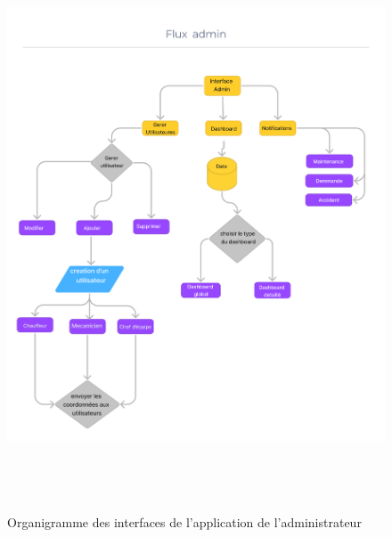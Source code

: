     
  \begin{figure}[htbp]
  \centering
  \includegraphics[width=1.05\textwidth,height=17cm]{chap2.images/org admin.png}
  \caption{Organigramme des interfaces de l'application de l'administrateur }
\end{figure}

